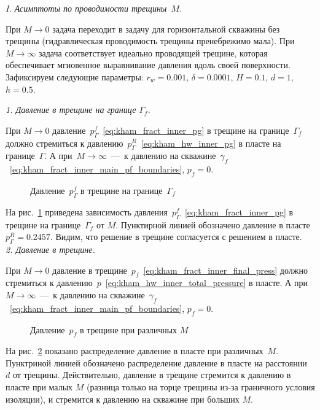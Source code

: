 \documentclass{article}
\begin{document}
\textit{I. Асимптоты по проводимости трещины~$M$.}

При $M \to 0$ задача переходит в задачу для горизонтальной скважины без трещины (гидравлическая проводимость трещины пренебрежимо мала).
При $M \to \infty$ задача соответствует идеально проводящей трещине, которая обеспечивает мгновенное выравнивание давления вдоль своей поверхности.
Зафиксируем следующие параметры: $r_w = 0.001$, $\delta=0.0001$, $H=0.1$, $d=1$, $h=0.5$.

\textit{ 1. Давление в трещине на границе $\Gamma_f$.}

При $M \to 0$ давление~$p_{\Gamma}^f$~\eqref{eq:kham_fract_inner_pg} в трещине на границе~$\Gamma_f$ должно
стремиться к давлению~$p_{\Gamma}^R$~\eqref{eq:kham_hw_inner_pg} в пласте на границе~$\Gamma$.
А при~$M \to \infty$~---~к давлению на
скважине~$\gamma_f$~\eqref{eq:kham_fract_inner_main_pf_boundaries}, $p_f = 0$.

\begin{figure}[H]
	\centering
	
	\caption{ Давление~$p_{\Gamma}^f$ в трещине на границе~$\Gamma_f$}
	\label{fig:kham_fract_inner_pgf_assympt}
\end{figure}

На рис.~\ref{fig:kham_fract_inner_pgf_assympt} приведена зависимость
давления~$p_{\Gamma}^f$~\eqref{eq:kham_fract_inner_pg}
в трещине на границе~$\Gamma_f$ от $M$. Пунктирной линией обозначено давление в пласте $p_{\Gamma}^R = 0.2457$.
Видим, что решение в трещине согласуется с решением в пласте. \\

\textit{ 2. Давление в трещине.}

При $M \to 0$ давление в трещине~$p_f$~\eqref{eq:kham_fract_inner_final_press} должно стремиться
к давлению~$p$~\eqref{eq:kham_hw_inner_total_pressure} в пласте. А при $M \to \infty$~---~к давлению на
скважине~$\gamma_f$~\eqref{eq:kham_fract_inner_main_pf_boundaries}, $p_f = 0$.

\begin{figure}[H]
	\centering
	
	\caption{Давление~$p_f$ в трещине при различных $M$}
	\label{fig:kham_fract_inner_pf_assympt}
\end{figure}

На рис.~\ref{fig:kham_fract_inner_pf_assympt} показано распределение давление в пласте при различных~$M$.
Пунктриной линией обозначено распределение давление в пласте на расстоянии~$d$ от трещины.
Действительно, давление в трещине стремится к давлению в пласте при малых $M$ (разница только на торце трещины
из-за граничного условия изоляции), и стремится к давлению на скважине при больших $M$.
\\
\end{document}
